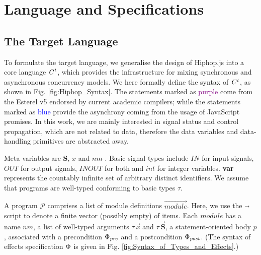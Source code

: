 \documentclass[acmsmall,10pt,review]{acmart}
\newcommand{\effect}{\textcolor{black}{\ensuremath{\mathrm{\Phi}}}}
\newcommand{\code}[1]{{\tt{\ensuremath{\m{#1}}}}}
\newcommand{\m}{\mathit}
\newcommand\figref[1]{Fig. \textcolor{black}{\ref{#1}}.}
\newcommand{\timedL}{\code{C^{t}}}
\begin{document}
{\section{Language and Specifications}
\label{sec:LanguageSpecifications}

\subsection{The Target Language}
\label{subsec:Targetlanguage}

To formulate the target language, we generalise the design of  Hiphop.js into a core language \code{\timedL}, 
which provides the infrastructure for mixing synchronous and asynchronous concurrency models. 
We here formally define the syntax of \code{\timedL}, as shown in \figref{fig:Hiphop_Syntax} The statements marked as \textcolor{purple} {purple} come from the  Esterel v5 \cite{berry1999constructive,berry2esterel} endorsed by current academic compilers; while the statements marked as \textcolor{blue} {blue} provide the asynchrony coming from the usage of JavaScript promises. 
In this work, we are mainly interested in signal status and control propagation, which are not related to data, therefore the data variables and data-handling primitives are abstracted away. 


Meta-variables are {\textbf{S}}, \code{x} and \code{nm} . Basic signal types include \code{IN} for input signals, \code{OUT} for output signals, \code{INOUT} for both and \code{int} for integer variables. {\textbf{var}} represents the countably infinite set of arbitrary distinct identifiers. We assume that programs are well-typed conforming to basic types \code{\tau}. 

A program \code{\mathcal{P} } comprises a list of module definitions \code{ \overrightarrow{module}}. Here, we use the \code{ \overrightarrow{}} script to denote a finite vector (possibly empty) of items.
Each \code{module} has a name \code{nm}, a list of well-typed arguments \code{ \overrightarrow{\tau\ x} } and $ \overrightarrow{\tau\ \textbf{S}}$, a statement-oriented body \code{{p}}, associated with a precondition \code{\effect_{pre}} and a postcondition \code{\effect_{post}}. (The syntax of effects specification \code{\effect} is given in \figref{fig:Syntax_of_Types_and_Effects})



}
\end{document}
